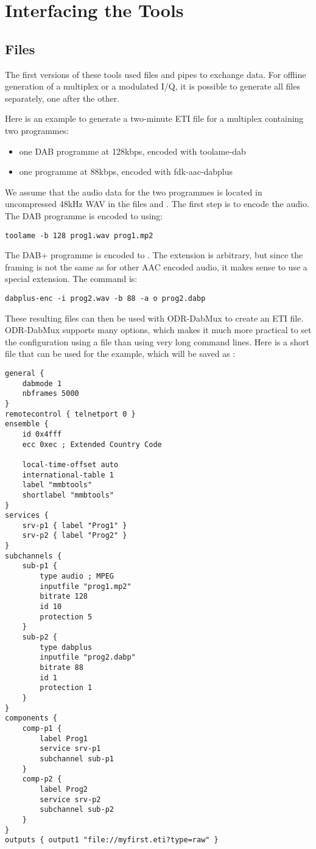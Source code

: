\section{Interfacing the Tools}
\subsection{Files}
The first versions of these tools used files and pipes to exchange data. For
offline generation of a multiplex or a modulated I/Q, it is possible to
generate all files separately, one after the other.

Here is an example to generate a two-minute ETI file for a multiplex containing two programmes:
\begin{itemize}
    \item one DAB programme at 128kbps, encoded with toolame-dab
    \item one \dabplus{} programme at 88kbps, encoded with fdk-aac-dabplus
\end{itemize}

We assume that the audio data for the two programmes is located in uncompressed
48kHz WAV in the files  and . The first step
is to encode the audio. The DAB programme is encoded to  using:
\begin{lstlisting}
toolame -b 128 prog1.wav prog1.mp2
\end{lstlisting}

The DAB+ programme is encoded to . The extension
 is arbitrary, but since the framing is not the same as for
other AAC encoded audio, it makes sense to use a special extension. The command
is:
\begin{lstlisting}
dabplus-enc -i prog2.wav -b 88 -a o prog2.dabp
\end{lstlisting}

These resulting files can then be used with ODR-DabMux to create an ETI file.
ODR-DabMux supports many options, which makes it much more practical to set
the configuration using a file than using very long command lines. Here is a short
file that can be used for the example, which will be saved as :
\begin{lstlisting}
general {
    dabmode 1
    nbframes 5000
}
remotecontrol { telnetport 0 }
ensemble {
    id 0x4fff
    ecc 0xec ; Extended Country Code

    local-time-offset auto
    international-table 1
    label "mmbtools"
    shortlabel "mmbtools"
}
services {
    srv-p1 { label "Prog1" }
    srv-p2 { label "Prog2" }
}
subchannels {
    sub-p1 {
        type audio ; MPEG
        inputfile "prog1.mp2"
        bitrate 128
        id 10
        protection 5
    }
    sub-p2 {
        type dabplus
        inputfile "prog2.dabp"
        bitrate 88
        id 1
        protection 1
    }
}
components {
    comp-p1 {
        label Prog1
        service srv-p1
        subchannel sub-p1
    }
    comp-p2 {
        label Prog2
        service srv-p2
        subchannel sub-p2
    }
}
outputs { output1 "file://myfirst.eti?type=raw" }
\end{lstlisting}

